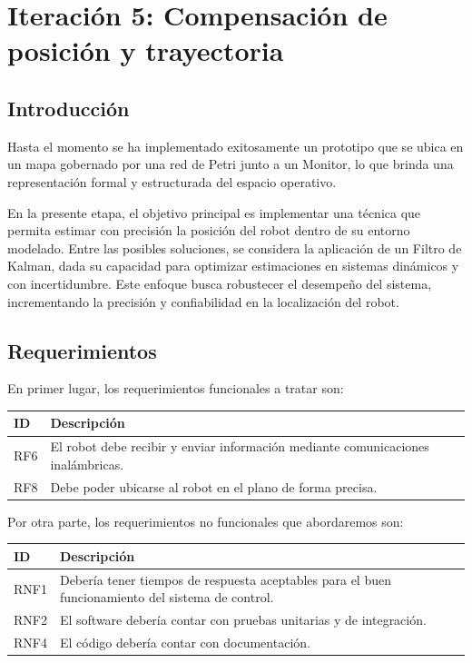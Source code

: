 \newpage
\section{Iteración 5: Compensación de posición y trayectoria}

\subsection{Introducción}

Hasta el momento se ha implementado exitosamente un prototipo que se ubica en un mapa gobernado por una red de Petri junto a un Monitor, lo que brinda una representación formal y estructurada del espacio operativo.

En la presente etapa, el objetivo principal es implementar una técnica que permita estimar con precisión la posición del robot dentro de su entorno modelado. Entre las posibles soluciones, se considera la aplicación de un Filtro de Kalman, dada su capacidad para optimizar estimaciones en sistemas dinámicos y con incertidumbre. Este enfoque busca robustecer el desempeño del sistema, incrementando la precisión y confiabilidad en la localización del robot.

\subsection{Requerimientos}

En primer lugar, los requerimientos funcionales a tratar son:

\begin{center}
\begin{tabular}{
    | >{\centering\arraybackslash}m{1cm}
    | >{\centering\arraybackslash}m{13cm} |
} 
\hline \rowcolor{test_header_color}
    ID & Descripción \\
\hline
    RF6 & El robot debe recibir y enviar información mediante comunicaciones inalámbricas. \\ 
\hline
    RF8 & Debe poder ubicarse al robot en el plano de forma precisa. \\
\hline
\end{tabular}
\end{center}

Por otra parte, los requerimientos no funcionales que abordaremos son:

\begin{center}
\begin{tabular}{
    | >{\centering\arraybackslash}m{1cm}
    | >{\centering\arraybackslash}m{13cm} |
}
\hline \rowcolor{test_header_color}
    ID & Descripción \\
\hline
    RNF1 & Debería tener tiempos de respuesta aceptables para el buen funcionamiento del sistema de control. \\
\hline
    RNF2 & El software debería contar con pruebas unitarias y de integración. \\
\hline
    RNF4 & El código debería contar con documentación. \\
\hline
\end{tabular}
\end{center}

